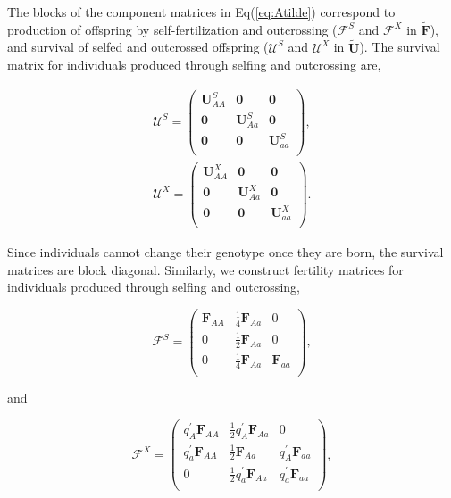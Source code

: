 \documentclass[11pt]{article}
\def\mbf#1{\mathbf{#1}}
\def\mcal#1{\mathcal{#1}}
\begin{document}
The blocks of the component matrices in Eq(\ref{eq:Atilde}) correspond to production of offspring by self-fertilization and outcrossing ($\mcal{F}^S$ and $\mcal{F}^X$ in $\tilde{\mbf{F}}$), and survival of selfed and outcrossed offspring ($\mcal{U}^S$ and $\mcal{U}^X$ in $\tilde{\mbf{U}}$). The survival matrix for individuals produced through selfing and outcrossing are,
\begin{linenomath*}
\begin{eqnarray} \label{eq:BlkUS}
	\mcal{U}^S  = 
		\left(
			\begin{array}{ccc}
				\mbf{U}^{S}_{AA} & \mbf{0} & \mbf{0} \\
				\mbf{0} & \mbf{U}^{S}_{Aa} & \mbf{0} \\
				\mbf{0} & \mbf{0} & \mbf{U}^{S}_{aa} \\
			\end{array} \right),\\
				\mcal{U}^X  = 
		\left(
			\begin{array}{ccc}
				\mbf{U}^{X}_{AA} & \mbf{0} & \mbf{0} \\
				\mbf{0} & \mbf{U}^{X}_{Aa} & \mbf{0} \\
				\mbf{0} & \mbf{0} & \mbf{U}^{X}_{aa} \\
			\end{array} \right).
\end{eqnarray}
\end{linenomath*}
Since individuals cannot change their genotype once they are born, the survival matrices are block diagonal.  Similarly, we construct fertility matrices for individuals produced through selfing and outcrossing, 
\begin{linenomath*}
\begin{equation} \label{eq:BlkFS}
	\mcal{F}^S = 
			\left(
			\begin{array}{ccc}
				\mbf{F}_{AA} & \frac{1}{4} \mbf{F}_{Aa} & 0 \\
				0 & \frac{1}{2} \mbf{F}_{Aa} & 0 \\
				0 & \frac{1}{4} \mbf{F}_{Aa} & \mbf{F}_{aa}\\
			\end{array} \right), 
\end{equation}
\end{linenomath*}
\noindent and 
\begin{linenomath*}
\begin{equation} \label{eq:BlkFX}
	\mcal{F}^X = 
			\left(
			\begin{array}{ccc}
				q^{\prime}_{A} \mbf{F}_{AA} & \frac{1}{2} q^{\prime}_{A} \mbf{F}_{Aa} & 0 \\ 
				q^{\prime}_{a} \mbf{F}_{AA} & \frac{1}{2} \mbf{F}_{Aa} & q^{\prime}_{A} \mbf{F}_{aa}  \\ 
				0 & \frac{1}{2} q^{\prime}_{a} \mbf{F}_{Aa} & q^{\prime}_{a} \mbf{F}_{aa}  \\
			\end{array} \right),
\end{equation}
\end{linenomath*}
\end{document}
